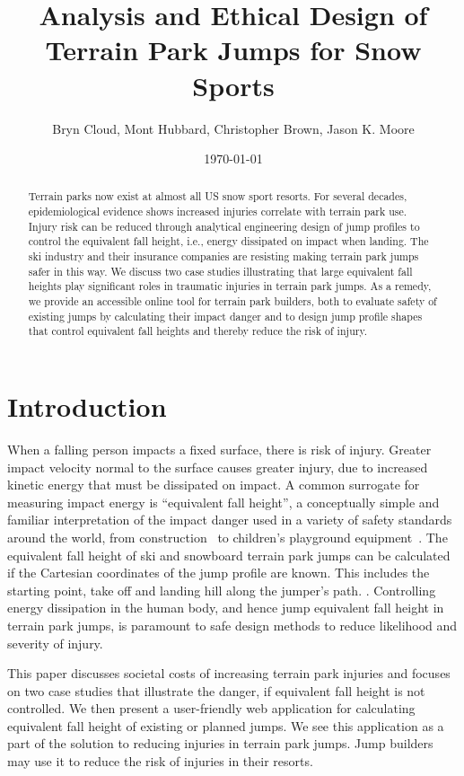 \documentclass{article}
\title{Analysis and Ethical Design of Terrain Park Jumps for Snow Sports}
\author{Bryn Cloud, Mont Hubbard, Christopher Brown, Jason K. Moore}
\date{\today}
\begin{document}
\maketitle

\begin{abstract}
  Terrain parks now exist at almost all US snow sport resorts. For several
  decades, epidemiological evidence shows increased injuries correlate 
  with terrain park use. Injury risk can be reduced through analytical engineering design of jump profiles to control the equivalent fall height, i.e., energy dissipated on impact when landing. The ski industry and their insurance companies are resisting making terrain park jumps safer in this way. We discuss
  two case studies illustrating that large equivalent fall heights play
  significant roles in traumatic injuries in terrain park jumps. As a remedy, we 
  provide an accessible online tool for terrain park builders, both to evaluate 
  safety of existing jumps by calculating their impact danger and to design jump 
  profile shapes that control equivalent fall heights and thereby reduce the risk of injury. 
\end{abstract}

\section{Introduction}
%
When a falling person impacts a fixed surface, there is risk of
injury. Greater impact velocity normal to the surface causes greater
injury, due to increased kinetic energy that must be dissipated on impact. A common surrogate
for measuring impact energy is ``equivalent fall height'', a conceptually simple and 
familiar interpretation of the impact danger used in a variety of safety
standards around the world, from construction~\cite{OSHA2021} to children's
playground equipment~\cite{Chalmers1996}. The equivalent fall height of ski and
snowboard terrain park jumps can be calculated if the Cartesian coordinates of the jump profile are known. This includes the starting point, take off and landing hill along the jumper's path. \cite{Hubbard2012}. Controlling energy dissipation in the human body, and hence jump equivalent fall height in terrain park jumps, is paramount to safe design methods to reduce likelihood and severity of injury. 

This paper discusses societal costs of increasing terrain park injuries
and focuses on two case studies that illustrate the danger, if
equivalent fall height is not controlled. We then present a user-friendly
web application for calculating equivalent fall height of existing or planned
jumps. We see this application as a part of the solution to reducing injuries in 
terrain park jumps. Jump builders may use it to reduce the risk of injuries in their resorts.
\end{document}
